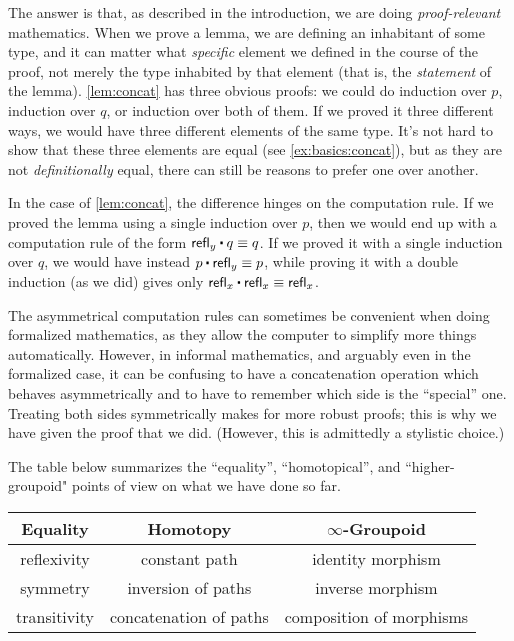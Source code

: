 The answer is that, as described in the introduction, we are doing \emph{proof-relevant} mathematics.
%
When we prove a lemma, we are defining an inhabitant of some type, and it can matter what \emph{specific} element we defined in the course of the proof, not merely the type inhabited by that element (that is, the \emph{statement} of the lemma).
\autoref{lem:concat} has three obvious proofs: we could do induction over $p$, induction over $q$, or induction over both of them.
If we proved it three different ways, we would have three different elements of the same type.
It's not hard to show that these three elements are equal (see \autoref{ex:basics:concat}), but as they are not \emph{definitionally} equal, there can still be reasons to prefer one over another.

In the case of \autoref{lem:concat}, the difference hinges on the computation rule.
If we proved the lemma using a single induction over $p$, then we would end up with a computation rule of the form $\refl{y} \ct q \jdeq q$.
If we proved it with a single induction over $q$, we would have instead $p\ct\refl{y}\jdeq p$, while proving it with a double induction (as we did) gives only $\refl{x}\ct\refl{x} \jdeq \refl{x}$.

%
The asymmetrical computation rules can sometimes be convenient when doing formalized mathematics, as they allow the computer to simplify more things automatically.
However, in informal mathematics, and arguably even in the formalized case, it can be confusing to have a concatenation operation which behaves asymmetrically and to have to remember which side is the ``special'' one.
Treating both sides symmetrically makes for more robust proofs; this is why we have given the proof that we did.
(However, this is admittedly a stylistic choice.)

The table below summarizes the ``equality'', ``homotopical'', and ``higher-groupoid" points of view on what we have done so far.
\begin{center}
  \medskip
  \begin{tabular}{ccc}
    \toprule
    Equality & Homotopy & $\infty$-Groupoid\\
    \midrule
    reflexivity\index{equality!reflexivity of} & constant path & identity morphism\\
    symmetry\index{equality!symmetry of} & inversion of paths & inverse morphism\\
    transitivity\index{equality!transitivity of} & concatenation of paths & composition of morphisms\\
    \bottomrule
  \end{tabular}
  \medskip
\end{center}

